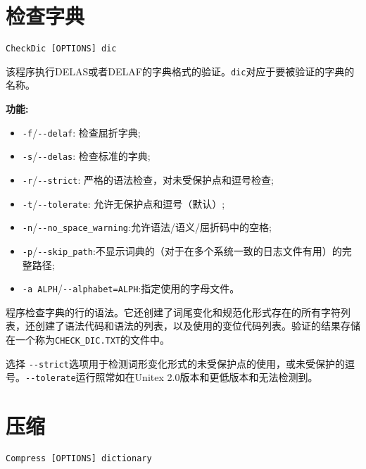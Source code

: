 \bigskip



\section{检查字典}
\verb+CheckDic [OPTIONS] dic+

\bigskip
\noindent 该程序执行DELAS或者DELAF的字典格式的验证。\verb+dic+对应于要被验证的字典的名称。

\bigskip
\noindent \textbf{功能:}
\begin{itemize}
\item \verb+-f+/\verb+--delaf+: 检查屈折字典;
\item \verb+-s+/\verb+--delas+: 检查标准的字典;
\item \verb+-r+/\verb+--strict+: 严格的语法检查，对未受保护点和逗号检查;
\item \verb+-t+/\verb+--tolerate+: 允许无保护点和逗号（默认）;
\item \verb+-n+/\verb+--no_space_warning+:允许语法/语义/屈折码中的空格;
\item \verb+-p+/\verb+--skip_path+:不显示词典的（对于在多个系统一致的日志文件有用）的完整路径; 
\item \verb+-a ALPH+/\verb+--alphabet=ALPH+:指定使用的字母文件。 
\end{itemize}

\bigskip
\noindent 程序检查字典的行的语法。它还创建了词尾变化和规范化形式存在的所有字符列表，还创建了语法代码和语法的列表，以及使用的变位代码列表。验证的结果存储在一个称为\verb+CHECK_DIC.TXT+的文件中。


\bigskip
\noindent 选择 \verb+--strict+选项用于检测词形变化形式的未受保护点的使用，或未受保护的逗号。\verb+--tolerate+运行照常如在Unitex 2.0版本和更低版本和无法检测到。




\section{压缩}
\label{section-compress}
\verb+Compress [OPTIONS] dictionary+

